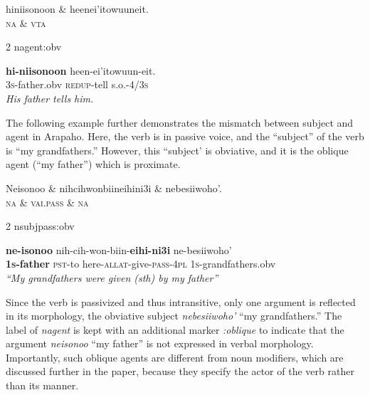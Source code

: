 \documentclass[11pt]{article}
\begin{document}
\small
\begin{exe}
\ex \label{agent:obv}%
\begin{dependency}
\begin{deptext}
hiniisonoon \& heenei'itowuuneit.\\
\textsc{na} \& \textsc{vta}\\
\end{deptext}
	{2}	{nagent:obv}
\end{dependency}
\gll \textbf{hi-niisonoon} {heen-ei'itowuun-eit}.\\
\textsc{3s}-father.obv {\textsc{redup}-tell s.o.-\textsc{4/3s}}\\
\trans \textit{His father tells him.}
\end{exe}
\normalsize
The following example further demonstrates the mismatch between subject and agent in Arapaho. Here, the verb is in passive voice, and the ``subject'' of the verb is ``my grandfathers.'' However, this ``subject' is obviative, and it is the oblique agent (``my father'') which is proximate.
 
 \small
\begin{exe}
\ex \label{middle}
\begin{dependency}
\begin{deptext}
Neisonoo \& nihcihwonbiineihini3i \& nebesiiwoho'.\\
\textsc{na} \& \textsc{vai.pass}	\& \textsc{na}\\
\end{deptext}
	{2}	{nsubjpass:obv}
\end{dependency}
\gll \textbf{ne-isonoo} {nih-cih-won-biin-\textbf{eihi-ni3i}} {ne-besiiwoho'} \\
\textbf{\textsc{1s}-father} {\textsc{pst}-to here-\textsc{allat}-give-\textsc{pass}-\textsc{4pl}} \textsc{1s}-grandfathers.obv\\
\trans \textit{``My grandfathers were given (sth) by my father''}
\end{exe}
\normalsize
Since the verb is passivized and thus intransitive, only one argument is reflected in its morphology, the obviative subject \textit{nebesiiwoho'} ``my grandfathers.'' The label of \textit{nagent} is kept with an additional marker \textit{:oblique} to indicate that the argument \textit{neisonoo} ``my father'' is not expressed in verbal morphology. Importantly, such oblique agents are different from noun modifiers, which are discussed further in the paper, because they specify the actor of the verb rather than its manner. 
\end{document}
